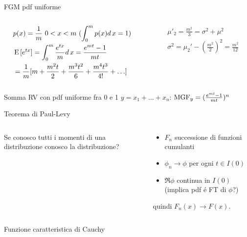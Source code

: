 \begin{wordonframe}{FGM pdf uniforme}
\begin{columns}[T]
\begin{column}{0.5\textwidth}
\begin{align*}
&p(x)=\frac{1}{m}\ 0<x<m\ (\int_0^mp(x)d\,x=1)\\
&\operatorname{E}{[e^{tx}]}=\int_0^m\frac{e^{tx}}{m}d\,x=\frac{e^{mt}-1}{mt}\\
&=\frac{1}{m}[m+\frac{m^2t}{2}+\frac{m^3t^2}{6}+\frac{m^4t^3}{4!}+\ldots]
\end{align*}
\end{column}
\begin{column}{0.5\textwidth}
\begin{align*}
&\mu'_2=\frac{m^2}{3}=\sigma^2+\mu^2\\
&\sigma^2=\mu_2'-(\frac{m^2}{2})^2=\frac{m^2}{12}
\end{align*}
\end{column}
\end{columns}
\begin{block}{Somma RV con pdf uniforme fra 0 e 1}
$y=x_1+\ldots+x_n$: $\operatorname{MGF}_y=(\frac{e^{mt}-1}{mt})^n$
\end{block}
\end{wordonframe}

\begin{frame}{Teorema di Paul-Levy}
	\begin{columns}[T]
		\begin{column}{0.3\textwidth}
			Se conosco tutti i momenti di una distribuzione conosco la distribuzione?
		\end{column}
		\begin{column}{0.7\textwidth}
			\begin{itemize}
				\item $F_n$ successione di funzioni cumulanti
				\item $\phi_n\to\phi$ per ogni $t\in I(0)$
				\item $\Re{\phi}$ continua in $I(0)$ (implica pdf \'e FT di $\phi$?)
			\end{itemize}
			quindi $F_n(x)\to F(x)$.
		\end{column}
	\end{columns}
\end{frame}

\begin{wordonframe}{Funzione caratteristica di Cauchy}

\end{wordonframe}

